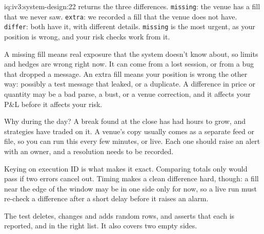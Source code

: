 \begin{solution}{iq:iv3:system-design:22}
 returns the three differences. \texttt{missing}: the venue has a fill that we never saw. \texttt{extra}: we recorded a fill that the venue does not have. \texttt{differ}: both have it, with different details. \texttt{missing} is the most urgent, as your position is wrong, and your risk checks work from it.
\label{lst:iv3:sd:recon}

A missing fill means real exposure that the system doesn't know about, so limits and hedges are wrong right now. It can come from a lost session, or from a bug that dropped a message. An extra fill means your position is wrong the other way: possibly a test message that leaked, or a duplicate. A difference in price or quantity may be a bad parse, a bust, or a venue correction, and it affects your P\&L before it affects your risk.

Why during the day? A break found at the close has had hours to grow, and strategies have traded on it. A venue's copy usually comes as a separate feed or file, so you can run this every few minutes, or live. Each one should raise an alert with an owner, and a resolution needs to be recorded.

Keying on execution ID is what makes it exact. Comparing totals only would pass if two errors cancel out. Timing makes a clean difference hard, though: a fill near the edge of the window may be in one side only for now, so a live run must re-check a difference after a short delay before it raises an alarm.

The test deletes, changes and adds random rows, and asserts that each is reported, and in the right list. It also covers two empty sides.

\end{solution}

